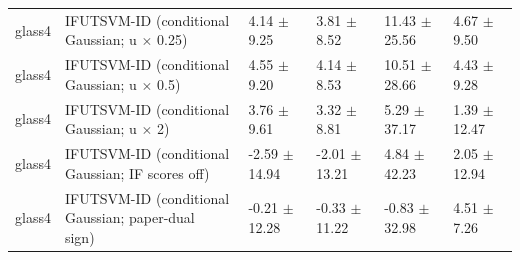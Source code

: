 \begin{table}[!t]
{\begin{tabular}{llllll}
glass4 & \shortstack[l]{IFUTSVM-ID (conditional\\Gaussian; u \(\times\) 0.25)} & 4.14 \(\pm\) 9.25 & 3.81 \(\pm\) 8.52 & 11.43 \(\pm\) 25.56 & 4.67 \(\pm\) 9.50 \\
glass4 & \shortstack[l]{IFUTSVM-ID (conditional\\Gaussian; u \(\times\) 0.5)} & 4.55 \(\pm\) 9.20 & 4.14 \(\pm\) 8.53 & 10.51 \(\pm\) 28.66 & 4.43 \(\pm\) 9.28 \\
glass4 & \shortstack[l]{IFUTSVM-ID (conditional\\Gaussian; u \(\times\) 2)} & 3.76 \(\pm\) 9.61 & 3.32 \(\pm\) 8.81 & 5.29 \(\pm\) 37.17 & 1.39 \(\pm\) 12.47 \\
glass4 & \shortstack[l]{IFUTSVM-ID (conditional\\Gaussian; IF scores off)} & -2.59 \(\pm\) 14.94 & -2.01 \(\pm\) 13.21 & 4.84 \(\pm\) 42.23 & 2.05 \(\pm\) 12.94 \\
glass4 & \shortstack[l]{IFUTSVM-ID (conditional\\Gaussian; paper-dual\\sign)} & -0.21 \(\pm\) 12.28 & -0.33 \(\pm\) 11.22 & -0.83 \(\pm\) 32.98 & 4.51 \(\pm\) 7.26 \\
\hline
\end{tabular}%
}
\end{table}

